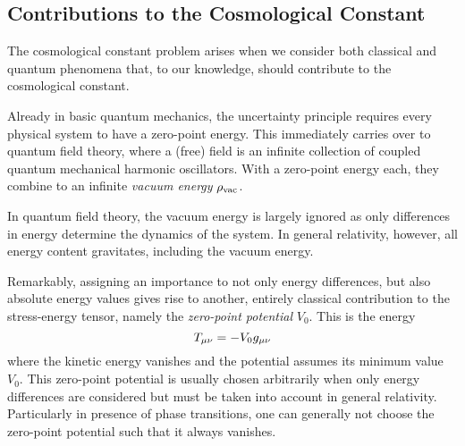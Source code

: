 \documentclass[parskip=half]{scrreprt}
\begin{document}
\subsection{Contributions to the Cosmological Constant}\label{sec:cc_contrib}

The cosmological constant problem arises when we consider both classical and quantum phenomena that, to our knowledge, should contribute to the cosmological constant.

Already in basic quantum mechanics, the uncertainty principle requires every physical system to have a zero-point energy. This immediately carries over to quantum field theory, where a (free) field is an infinite collection of coupled quantum mechanical harmonic oscillators. With a zero-point energy each, they combine to an infinite \emph{vacuum energy} \(\rho_\textnormal{vac}\). 
 
In quantum field theory, the vacuum energy is largely ignored as only differences in energy determine the dynamics of the system. In general relativity, however, all energy content gravitates, including the vacuum energy.  

Remarkably, assigning an importance to not only energy differences, but also absolute energy values gives rise to another, entirely classical contribution to the stress-energy tensor, namely the \emph{zero-point potential} \(V_0\). This is the energy
\begin{equation}
	T_{\mu\nu} = - V_0 g_{\mu\nu}
\end{equation}
where the kinetic energy vanishes and the potential assumes its minimum value \(V_0\). This zero-point potential is usually chosen arbitrarily when only energy differences are considered but must be taken into account in general relativity. Particularly in presence of phase transitions, one can generally not choose the zero-point potential such that it always vanishes.
\end{document}
